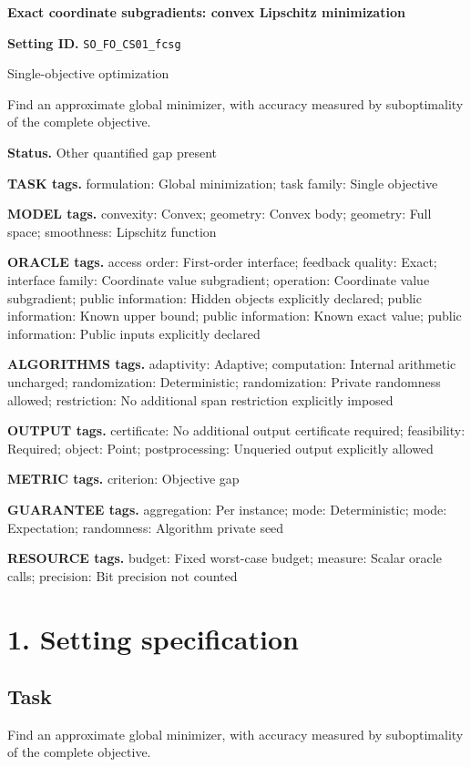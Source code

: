 \documentclass[10pt,a4paper]{article}
\begin{document}
\raggedright

{\LARGE\bfseries\sffamily\color{AtlasNavy} Exact coordinate subgradients: convex Lipschitz minimization\par}\vspace{5pt}
\textbf{Setting ID.} \texttt{SO\_\allowbreak{}FO\_\allowbreak{}CS01\_\allowbreak{}fcsg}

Single-objective optimization

Find an approximate global minimizer, with accuracy measured by suboptimality of the complete objective.

\textbf{Status.} Other quantified gap present

\textbf{TASK tags.} formulation: Global minimization; task family: Single objective

\textbf{MODEL tags.} convexity: Convex; geometry: Convex body; geometry: Full space; smoothness: Lipschitz function

\textbf{ORACLE tags.} access order: First-order interface; feedback quality: Exact; interface family: Coordinate value subgradient; operation: Coordinate value subgradient; public information: Hidden objects explicitly declared; public information: Known upper bound; public information: Known exact value; public information: Public inputs explicitly declared

\textbf{ALGORITHMS tags.} adaptivity: Adaptive; computation: Internal arithmetic uncharged; randomization: Deterministic; randomization: Private randomness allowed; restriction: No additional span restriction explicitly imposed

\textbf{OUTPUT tags.} certificate: No additional output certificate required; feasibility: Required; object: Point; postprocessing: Unqueried output explicitly allowed

\textbf{METRIC tags.} criterion: Objective gap

\textbf{GUARANTEE tags.} aggregation: Per instance; mode: Deterministic; mode: Expectation; randomness: Algorithm private seed

\textbf{RESOURCE tags.} budget: Fixed worst-case budget; measure: Scalar oracle calls; precision: Bit precision not counted

\section{1. Setting specification}
\subsection{Task}
Find an approximate global minimizer, with accuracy measured by suboptimality of the complete objective.
\end{document}
